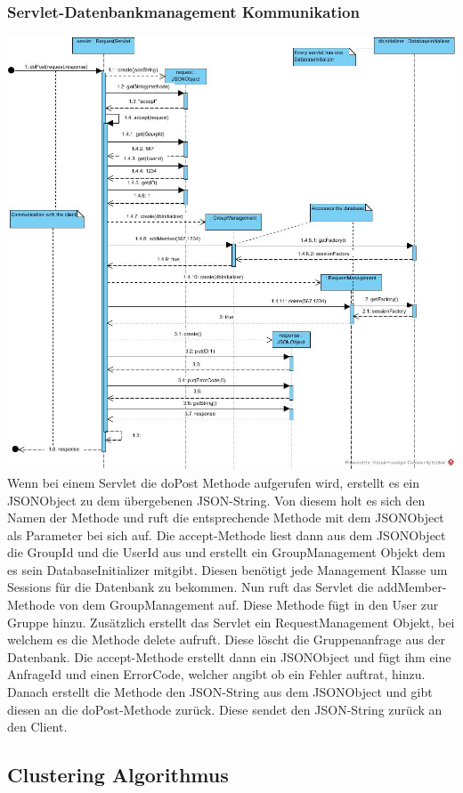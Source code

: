 \hypertarget{ServletDatenbank}{}
\subsubsection{Servlet-Datenbankmanagement Kommunikation}

\includegraphics[width=1.1\textwidth]{Servlet_MAnagement.jpg}
Wenn bei einem Servlet die doPost Methode aufgerufen wird, erstellt es ein JSONObject zu dem übergebenen JSON-String.
Von diesem holt es sich den Namen der Methode und ruft die entsprechende Methode mit dem JSONObject als Parameter bei sich auf. Die accept-Methode liest dann aus dem JSONObject die GroupId und die UserId aus und erstellt ein GroupManagement Objekt dem es sein DatabaseInitializer mitgibt. Diesen benötigt jede Management Klasse um Sessions für die Datenbank zu bekommen.
Nun ruft das Servlet die addMember-Methode von dem GroupManagement auf. Diese Methode fügt in den User zur Gruppe hinzu. Zusätzlich erstellt das Servlet ein RequestManagement Objekt, bei welchem es die Methode delete aufruft. Diese löscht die Gruppenanfrage aus der Datenbank. Die accept-Methode erstellt dann ein JSONObject und fügt ihm eine AnfrageId und einen ErrorCode, welcher angibt ob ein Fehler auftrat, hinzu. Danach erstellt die Methode den JSON-String aus dem JSONObject und gibt diesen an die doPost-Methode zurück. Diese sendet den JSON-String zurück an den Client.

\subsection{Clustering Algorithmus}
	
	\newpage